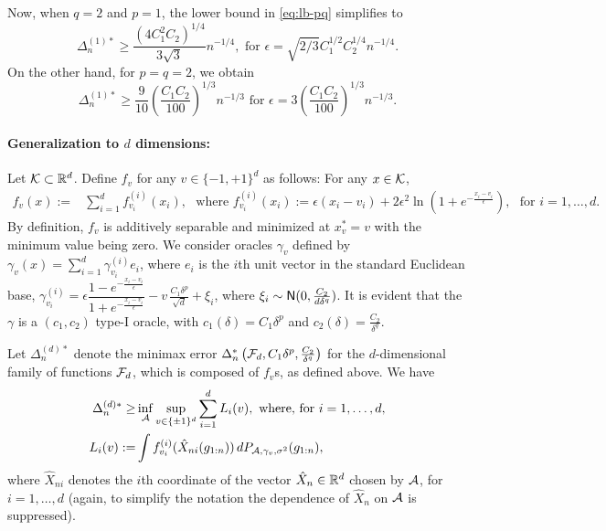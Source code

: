 Now, when $q=2$ and $p=1$, the lower bound in \eqref{eq:lb-pq} simplifies to
\[
\Delta_n^{(1)*} \ge \dfrac{ (4C_1^2C_2)^{1/4}}{3\sqrt{3}} n^{-1/4}, \text{ for } \epsilon=\sqrt{2/3}C_1^{1/2}C_2^{1/4} n^{-1/4}.
\]
On the other hand, for $p=q=2$, we obtain
\[
\Delta_n^{(1)*} \ge  \frac{9}{10}\left(\frac{C_1 C_2}{100}\right)^{1/3} n^{-1/3} \text{ for } \epsilon=3\left(\frac{C_1 C_2}{100}\right)^{1/3}n^{-1/3}.
\]



\paragraph{Generalization to $d$ dimensions:}

Let $\mathcal{K} \subset \mathbb{R}^d$.
Define $f_v$ for any $v\in \{-1,+1\}^d$ as follows: For any $x \in \mathcal{K}$, 
\begin{align*}
  f_v(x) :=& \sum_{i=1}^d f^{(i)}_{v_i}(x_i), \,\,  \text{ where }
  f^{(i)}_{v_i}(x_i) := \epsilon\left( x_i-v_i\right)+2\epsilon^2 \ln\left(1+e^{-\frac{x_i-v_i}{\epsilon}}  \right),  \,\, \text{ for } i=1,\ldots,d.
\end{align*}
By definition, $f_v$ is additively separable and minimized at $x^*_v=v$ with the minimum value being zero.
We consider oracles $\gamma_v$ defined by
$\gamma_v(x) = \sum_{i=1}^d \gamma_{v_i}^{(i)}e_i$, where 
$e_i$ is the $i$th unit vector in the standard Euclidean base,
$\gamma_{v_i}^{(i)} = 
\epsilon \dfrac{1-e^{-\frac{x_i-v_i}{\epsilon}}}{1+e^{-\frac{x_i-v_i}{\epsilon}}} - v\, \frac{C_1 \delta^p}{\sqrt{d}}  + \xi_i
$, where $\xi_i \sim \mathsf{N}(0,\frac{C_2}{d\delta^q})$. 
It is evident that the $\gamma$ is a $(c_1,c_2)$ type-I oracle, with $c_1(\delta)=C_1\delta^p$ and $c_2(\delta)=\frac{C_2}{\delta^q}$.

Let $\Delta_n^{(d)*}$ denote the minimax error $\Delta_n^*\left(\mathcal{F}_d, C_1\delta^p,\frac{C_2}{\delta^q}\right)$ for the $d$-dimensional family of functions $\mathcal{F}_d$, which is composed of $f_v$s, as defined above. We have
\begin{align*}
 \Delta_n^{(d)*} \ge& \inf_{\mathcal{A}}  \sup_{v\in \{\pm 1 \}^d}\sum_{i=1}^d L_i(v), \text{ where, for } i=1,\ldots,d,\\
 L_i(v) := & \int f^{(i)}_{v_i}(\hat X_{ni}(g_{1:n}) )\, dP_{\mathcal{A},\gamma_v,\sigma^2}(g_{1:n}),  
\end{align*}
where $\hat{X}_{ni}$ denotes the $i$th coordinate of the vector $\hat{X}_n \in \mathbb{R}^d$ chosen by $\mathcal{A}$, for $i=1,\ldots,d$
(again, to simplify the notation the dependence of $\hat{X}_n$ on $\mathcal{A}$ is suppressed).



